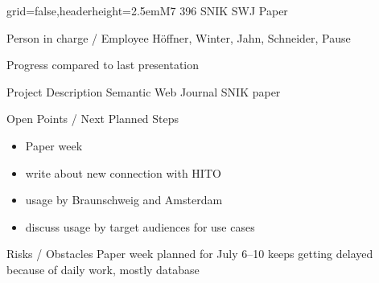 \documentclass[english]{kiesgrube}
\begin{document}
\newpage
\begin{poster}{grid=false,headerheight=2.5em}{}{M7 396 SNIK SWJ Paper}{}{}
\begin{posterbox}[name=person,column=0,row=0]{Person in charge / Employee}
Höffner, Winter, Jahn, Schneider, Pause
\end{posterbox}
\begin{posterbox}[name=progress,below=person]{Progress compared to last presentation}
\end{posterbox}
\begin{posterbox}[name=description,column=1,row=0]{Project Description}
Semantic Web Journal SNIK paper
\end{posterbox}
\begin{posterbox}[name=open,column=1,below=description]{Open Points / Next Planned Steps}
\begin{itemize}
\item Paper week
\item write about new connection with HITO
\item usage by Braunschweig and Amsterdam
\item discuss usage by target audiences for use cases
\end{itemize}
\end{posterbox}
\begin{posterbox}[name=risks,column=1,below=open]{Risks / Obstacles}
Paper week planned for July 6--10 keeps getting delayed because of daily work, mostly database
\end{posterbox}
\footer
\end{poster}
\end{document}
